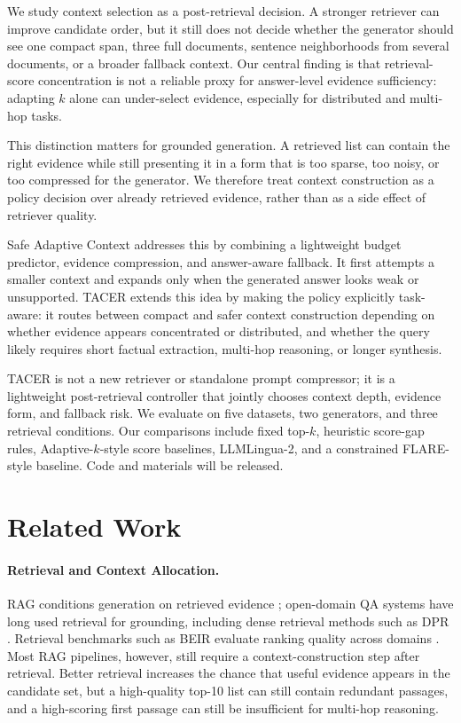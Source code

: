 \documentclass[11pt]{article}
\begin{document}
We study context selection as a post-retrieval decision. A stronger retriever can improve candidate order, but it still does not decide whether the generator should see one compact span, three full documents, sentence neighborhoods from several documents, or a broader fallback context. Our central finding is that retrieval-score concentration is not a reliable proxy for answer-level evidence sufficiency: adapting $k$ alone can under-select evidence, especially for distributed and multi-hop tasks.

This distinction matters for grounded generation. A retrieved list can contain the right evidence while still presenting it in a form that is too sparse, too noisy, or too compressed for the generator. We therefore treat context construction as a policy decision over already retrieved evidence, rather than as a side effect of retriever quality.

Safe Adaptive Context addresses this by combining a lightweight budget predictor, evidence compression, and answer-aware fallback. It first attempts a smaller context and expands only when the generated answer looks weak or unsupported. TACER extends this idea by making the policy explicitly task-aware: it routes between compact and safer context construction depending on whether evidence appears concentrated or distributed, and whether the query likely requires short factual extraction, multi-hop reasoning, or longer synthesis.

TACER is not a new retriever or standalone prompt compressor; it is a lightweight post-retrieval controller that jointly chooses context depth, evidence form, and fallback risk. We evaluate on five datasets, two generators, and three retrieval conditions. Our comparisons include fixed top-$k$, heuristic score-gap rules, Adaptive-$k$-style score baselines, LLMLingua-2, and a constrained FLARE-style baseline. Code and materials will be released.

\section{Related Work}

\paragraph{Retrieval and Context Allocation.}
RAG conditions generation on retrieved evidence \citep{lewis2020rag}; open-domain QA systems have long used retrieval for grounding, including dense retrieval methods such as DPR \citep{karpukhin2020dpr}. Retrieval benchmarks such as BEIR evaluate ranking quality across domains \citep{thakur2021beir}. Most RAG pipelines, however, still require a context-construction step after retrieval. Better retrieval increases the chance that useful evidence appears in the candidate set, but a high-quality top-10 list can still contain redundant passages, and a high-scoring first passage can still be insufficient for multi-hop reasoning.
\end{document}
